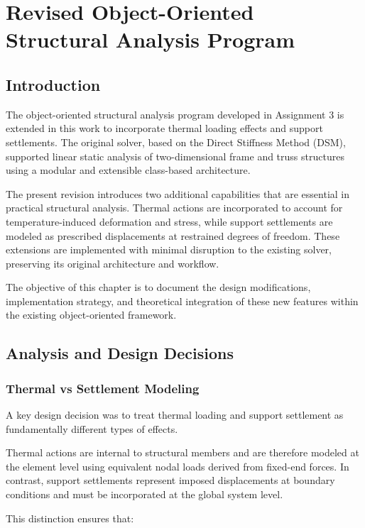 \chapter{Revised Object-Oriented Structural Analysis Program}

\section{Introduction}
The object-oriented structural analysis program developed in Assignment 3 is extended in this work to incorporate thermal loading effects and support settlements. The original solver, based on the Direct Stiffness Method (DSM), supported linear static analysis of two-dimensional frame and truss structures using a modular and extensible class-based architecture.

The present revision introduces two additional capabilities that are essential in practical structural analysis. Thermal actions are incorporated to account for temperature-induced deformation and stress, while support settlements are modeled as prescribed displacements at restrained degrees of freedom. These extensions are implemented with minimal disruption to the existing solver, preserving its original architecture and workflow.

The objective of this chapter is to document the design modifications, implementation strategy, and theoretical integration of these new features within the existing object-oriented framework.

\pagebreak
\section{Analysis and Design Decisions}

\subsection{Thermal vs Settlement Modeling}

A key design decision was to treat thermal loading and support settlement as fundamentally different types of effects.

Thermal actions are internal to structural members and are therefore modeled at the element level using equivalent nodal loads derived from fixed-end forces. In contrast, support settlements represent imposed displacements at boundary conditions and must be incorporated at the global system level.

This distinction ensures that:

